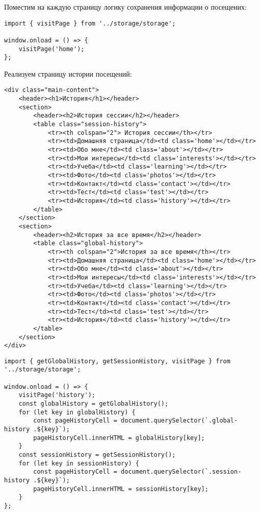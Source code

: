 \documentclass[a4paper,14pt]{extarticle}
\begin{document}
Поместим на каждую страницу логику сохранения информации о посещених:

\begin{lstlisting}
import { visitPage } from '../storage/storage';

window.onload = () => {
    visitPage('home');
};
\end{lstlisting}

Реализуем страницу истории посещений:
\begin{lstlisting}
<div class="main-content">
    <header><h1>История</h1></header>
    <section>
        <header><h2>История сессии</h2></header>
        <table class="session-history">
            <tr><th colspan="2"> История сессии</th></tr>
            <tr><td>Домашняя страница</td><td class='home'></td></tr>
            <tr><td>Обо мне</td><td class='about'></td></tr>
            <tr><td>Мои интересы</td><td class='interests'></td></tr>
            <tr><td>Учеба</td><td class='learning'></td></tr>
            <tr><td>Фото</td><td class='photos'></td></tr>
            <tr><td>Контакт</td><td class='contact'></td></tr>
            <tr><td>Тест</td><td class='test'></td></tr>
            <tr><td>История</td><td class='history'></td></tr>
        </table>
    </section>
    <section>
        <header><h2>История за все время</h2></header>
        <table class="global-history">
            <tr><th colspan="2">История за все время</th></tr>
            <tr><td>Домашняя страница</td><td class='home'></td></tr>
            <tr><td>Обо мне</td><td class='about'></td></tr>
            <tr><td>Мои интересы</td><td class='interests'></td></tr>
            <tr><td>Учеба</td><td class='learning'></td></tr>
            <tr><td>Фото</td><td class='photos'></td></tr>
            <tr><td>Контакт</td><td class='contact'></td></tr>
            <tr><td>Тест</td><td class='test'></td></tr>
            <tr><td>История</td><td class='history'></td></tr>
        </table>
    </section>
</div>
\end{lstlisting}

\begin{lstlisting}
import { getGlobalHistory, getSessionHistory, visitPage } from '../storage/storage';

window.onload = () => {
    visitPage('history');
    const globalHistory = getGlobalHistory();
    for (let key in globalHistory) {
        const pageHistoryCell = document.querySelector(`.global-history .${key}`);
        pageHistoryCell.innerHTML = globalHistory[key];
    }
    const sessionHistory = getSessionHistory();
    for (let key in sessionHistory) {
        const pageHistoryCell = document.querySelector(`.session-history .${key}`);
        pageHistoryCell.innerHTML = sessionHistory[key];
    }
};
\end{lstlisting}
\end{document}
